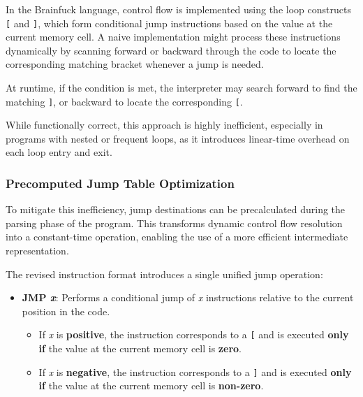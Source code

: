 \par In the Brainfuck language, control flow is implemented using the loop constructs \texttt{[} and \texttt{]}, which form conditional jump instructions based on the value at the current memory cell. A naive implementation might process these instructions dynamically by scanning forward or backward through the code to locate the corresponding matching bracket whenever a jump is needed.

\par At runtime, if the condition is met, the interpreter may search forward to find the matching \texttt{]}, or backward to locate the corresponding \texttt{[}.

\par While functionally correct, this approach is highly inefficient, especially in programs with nested or frequent loops, as it introduces linear-time overhead on each loop entry and exit.

\subsubsection*{Precomputed Jump Table Optimization}

\par To mitigate this inefficiency, jump destinations can be precalculated during the parsing phase of the program. This transforms dynamic control flow resolution into a constant-time operation, enabling the use of a more efficient intermediate representation.

\par The revised instruction format introduces a single unified jump operation:

\begin{itemize}
    \item \textbf{JMP \textit{x}}: Performs a conditional jump of \textit{x} instructions relative to the current position in the code.
    \begin{itemize}
        \item If \textit{x} is \textbf{positive}, the instruction corresponds to a \texttt{[} and is executed \textbf{only if} the value at the current memory cell is \textbf{zero}.
        \item If \textit{x} is \textbf{negative}, the instruction corresponds to a \texttt{]} and is executed \textbf{only if} the value at the current memory cell is \textbf{non-zero}.
    \end{itemize}
\end{itemize}

